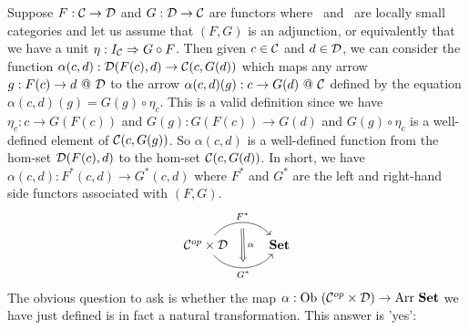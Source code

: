 Suppose $F:\mbox{$\cal C$}\to\mbox{$\cal D$}$ and $G:\mbox{$\cal D$}\to\mbox{$\cal C$}$ are functors where \Cat\ and \Dat\ 
are locally small categories and let us assume that $(F,G)$ is an adjunction, 
or equivalently that we have a unit $\eta:I_{\cal C}\Rightarrow G\circ F$. 
Then given $c\in\mbox{$\cal C$}$ and $d\in\mbox{$\cal D$}$, we can consider the function
$\alpha(c,d):\mbox{$\cal D$}(F(c),d)\to\mbox{$\cal C$}(c,G(d))$ which maps any arrow $g:F(c)\to d\ @\ 
\Dat$ to the arrow $\alpha(c,d)(g):c\to G(d)\ @\ \mbox{$\cal C$}$ defined by the equation
$\alpha(c,d)(g)=G(g)\circ\eta_{c}$. This is a valid definition since we have
$\eta_{c}:c\to G(F(c))$ and $G(g):G(F(c))\to G(d)$ and $G(g)\circ\eta_{c}$
is a well-defined element of $\mbox{$\cal C$}(c,G(g))$. So $\alpha(c,d)$ is a well-defined
function from the hom-set $\mbox{$\cal D$}(F(c),d)$ to the hom-set $\mbox{$\cal C$}(c,G(d))$. In short,
we have $\alpha(c,d):F^{*}(c,d)\to G^{*}(c,d)$ where $F^{*}$ and $G^{*}$
are the left and right-hand side functors associated with $(F,G)$. 
    \[
        \begin{tikzcd}
            \Cop\times\Dat \arrow[r, "F^{*}", bend left  = 50, ""{name=U, below}]
                 \arrow[r, swap, "G^{*}", bend right = 50, ""{name=D, above}]
              & \Set
            \arrow[Rightarrow, "\,\alpha", from = U, to = D]
        \end{tikzcd}
    \]
The obvious question to ask is whether the map $\alpha:\mbox{\rm Ob}\ (\mbox{${\cal C}^{op}$}\times\mbox{$\cal D$})
\to\mbox{\rm Arr}\ \mbox{\bf Set}$ we have just defined is in fact a natural transformation.
This answer is 'yes':

